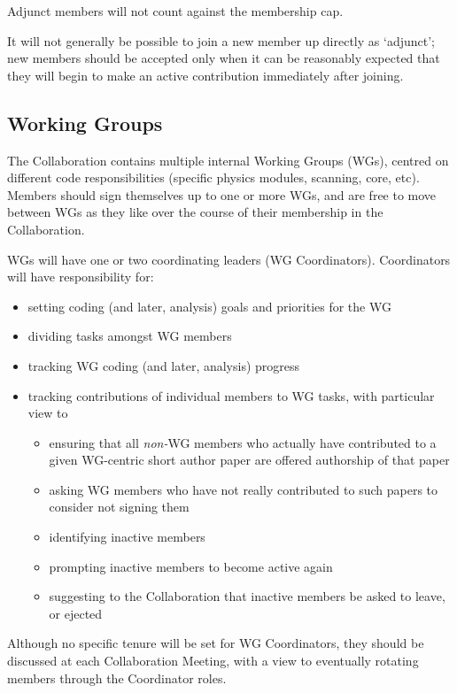 Adjunct members will not count against the membership cap.

It will not generally be possible to join a new member up directly as `adjunct'; new members should be accepted only when it can be reasonably expected that they will begin to make an active contribution immediately after joining.

\subsection{Working Groups}

The Collaboration contains multiple internal Working Groups (WGs), centred on different code responsibilities (specific physics modules, scanning, core, etc).  Members should sign themselves up to one or more WGs, and are free to move between WGs as they like over the course of their membership in the Collaboration.

WGs will have one or two coordinating leaders (WG Coordinators).  Coordinators will have responsibility for:
\begin{itemize}
  \item setting coding (and later, analysis) goals and priorities for the WG
  \item dividing tasks amongst WG members
  \item tracking WG coding (and later, analysis) progress
  \item tracking contributions of individual members to WG tasks, with particular view to\begin{itemize}
  \item ensuring that all \textit{non-}WG members who actually have contributed to a given WG-centric short author paper are offered authorship of that paper
  \item asking WG members who have not really contributed to such papers to consider not signing them
  \item identifying inactive members 
  \item prompting inactive members to become active again
  \item suggesting to the Collaboration that inactive members be asked to leave, or ejected 
  \end{itemize}
\end{itemize}

Although no specific tenure will be set for WG Coordinators, they should be discussed at each Collaboration Meeting, with a view to eventually rotating members through the Coordinator roles.

